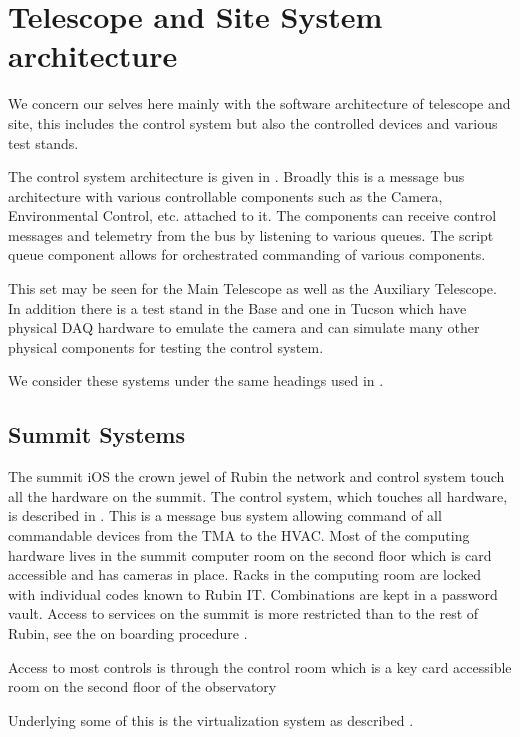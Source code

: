 \section{Telescope and Site  System architecture} \label{sec:tsarc}

 We concern our selves here mainly with the software architecture of telescope and site,
this includes the control system but also the controlled devices and various test stands.

The control system architecture is given in .
Broadly this is a message bus architecture with  various controllable components such as the Camera, Environmental Control, etc. attached to it.
The components can receive control messages and telemetry from the bus by listening to various queues.
The script queue component allows for orchestrated commanding of various components.

This set may be seen for the Main Telescope as well as the Auxiliary Telescope.
In addition there is a test stand in the Base and one in Tucson which have physical DAQ hardware to emulate the camera and can simulate many other physical components for testing the control system.

We consider these systems under the same headings used in .





\subsection{Summit Systems}
The summit iOS the crown jewel of Rubin the network and control system touch all the hardware on the summit.
The control system, which touches all hardware, is described in .
This is a message bus system allowing command of all commandable devices from the \gls{TMA} to the \gls{HVAC}.
Most of the computing hardware lives in the summit computer room on the second floor  which is card accessible and has cameras in place.
Racks in the computing room are locked with individual codes known to Rubin IT.
Combinations are kept in a password vault.
Access to services on the summit is more restricted than to the rest of Rubin, see the on boarding procedure .

Access to most controls is through the control room which is a key card accessible room on the second floor of the observatory



Underlying some of this is the virtualization system as described .


